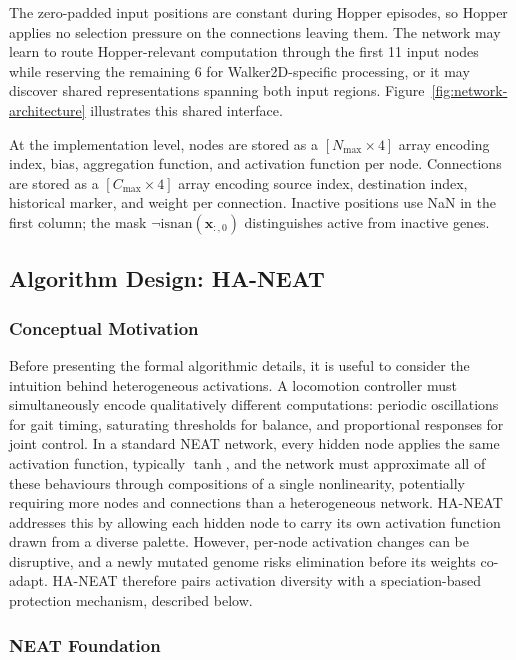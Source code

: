 \documentclass[12pt]{article}
\begin{document}
The zero-padded input positions are constant during Hopper episodes, so Hopper applies no selection pressure on the connections leaving them.
The network may learn to route Hopper-relevant computation through the first 11 input nodes while reserving the remaining 6 for Walker2D-specific processing, or it may discover shared representations spanning both input regions.
Figure~\ref{fig:network-architecture} illustrates this shared interface.

At the implementation level, nodes are stored as a $[N_{\max} \times 4]$ array encoding index, bias, aggregation function, and activation function per node.
Connections are stored as a $[C_{\max} \times 4]$ array encoding source index, destination index, historical marker, and weight per connection.
Inactive positions use NaN in the first column; the mask $\neg\text{isnan}(\mathbf{x}_{:,0})$ distinguishes active from inactive genes.


\subsection{Algorithm Design: HA-NEAT}
\label{subsec:algorithm-design-ha-neat}

\subsubsection{Conceptual Motivation}
\label{subsubsec:conceptual-motivation}

Before presenting the formal algorithmic details, it is useful to consider the intuition behind heterogeneous activations.
A locomotion controller must simultaneously encode qualitatively different computations: periodic oscillations for gait timing, saturating thresholds for balance, and proportional responses for joint control.
In a standard NEAT network, every hidden node applies the same activation function, typically $\tanh$, and the network must approximate all of these behaviours through compositions of a single nonlinearity, potentially requiring more nodes and connections than a heterogeneous network.
HA-NEAT addresses this by allowing each hidden node to carry its own activation function drawn from a diverse palette.
However, per-node activation changes can be disruptive, and a newly mutated genome risks elimination before its weights co-adapt.
HA-NEAT therefore pairs activation diversity with a speciation-based protection mechanism, described below.

\subsubsection{NEAT Foundation}
\label{subsubsec:neat-foundation}
\end{document}
